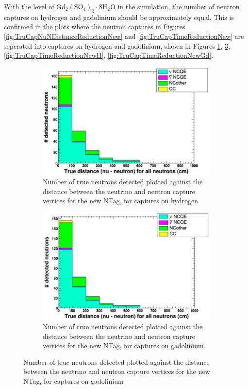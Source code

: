 With the level of $\mathrm{Gd}_{2}\left(\mathrm{SO}_{4}\right)_{3} \cdot 8 \mathrm{H}_{2} \mathrm{O}$ in the simulation, the number of neutron captures on hydrogen and gadolinium should be approximately equal. This is confirmed in the plots where the neutron captures in Figures \ref{fig:TruCapNuNDistanceReductionNew} and \ref{fig:TruCapTimeReductionNew} are seperated into captures on hydrogen and gadolinium, shown in Figures \ref{fig:TruCapNuNDistanceReductionNewH}, \ref{fig:TruCapNuNDistanceReductionNewGd}, \ref{fig:TruCapTimeReductionNewH}, \ref{fig:TruCapTimeReductionNewGd}.

\begin{figure}
    \centering
     \begin{subfigure}[b]{0.45\linewidth}
      \includegraphics[width=\linewidth]{Figures/TruCapNuNDistanceReductionNewH.PNG}
      \caption{Number of true neutrons detected plotted against the distance between the neutrino and neutron capture vertices for the new NTag, for captures on hydrogen}
      \label{fig:TruCapNuNDistanceReductionNewH} 
     \end{subfigure}
     \begin{subfigure}[b]{0.45\linewidth}
       \includegraphics[width=\linewidth]{Figures/TruCapNuNDistanceReductionNewGd.PNG}
        \caption{Number of true neutrons detected plotted against the distance between the neutrino and neutron capture vertices for the new NTag, for captures on gadolinium} 
        \label{fig:TruCapNuNDistanceReductionNewGd}
      \end{subfigure} 
\end{figure}


